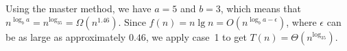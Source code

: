 Using the master method, we have $a=5$ and $b=3$, which means that $n^{\log_ba}=n^{\log_35}=\Omega(n^{1.46})$.
Since $f(n)=n\lg n=O(n^{\log_ba-\epsilon})$, where $\epsilon$ can be as large as approximately $0.46$, we apply case~1 to get $T(n)=\Theta(n^{\log_35})$.
